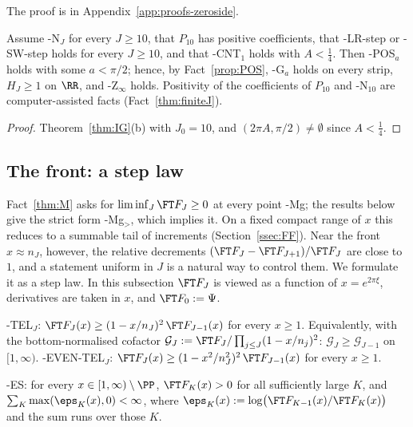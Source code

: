 The proof is in Appendix~\ref{app:proofs-zeroside}.

\begin{corollary}\label{cor:POSroute}
Assume \hyp{N}$_J$ for every $J\ge10$, that $P_{10}$ has positive coefficients, that \hyp{LR-step} or
\hyp{SW-step} holds for every $J\ge10$, and that \hyp{CNT$_1$} holds with $A<\frac14$. Then \hyp{POS$_a$} holds with some
$a<\pi/2$; hence, by Fact~\ref{prop:POS}, \hyp{G$_a$} holds on every strip, $H_J\ge1$ on $\RR$, and
\hyp{Z$_\infty$} holds. Positivity of the coefficients of $P_{10}$ and \hyp{N}$_{10}$ are computer-assisted facts
(Fact~\ref{thm:finiteJ}).
\end{corollary}

\begin{proof}
Theorem~\ref{thm:IG}(b) with $J_0=10$, and $(2\pi A,\pi/2)\ne\emptyset$ since $A<\frac14$.
\end{proof}

\subsection{The front: a step law}\label{ssec:front}

Fact~\ref{thm:M} asks for $\liminf_J\FT F_J\ge0$ at every point \hyp{Mg}; the results below give the strict form \hyp{Mg$_>$},
which implies it. On a fixed compact range of $x$ this reduces to a summable tail of increments (Section~\ref{ssec:FF}). Near the
front $x\approx n_J$, however, the relative decrements $(\FT F_J-\FT F_{J+1})/\FT F_J$ are close to $1$, and a statement uniform in $J$
is a natural way to control them. We formulate it as a step law. In this subsection $\FT F_J$ is viewed as a function of $x=e^{2\pi\xi}$,
derivatives are taken in $x$, and $\FT F_0:=\Psi$.

\begin{hypothesis}\label{hyp:TEL}
\hyp{TEL$_J$}: $\FT F_J(x)\ge(1-x/n_J)^2\,\FT F_{J-1}(x)$ for every $x\ge1$. Equivalently, with the bottom-normalised
cofactor $\mathcal G_J:=\FT F_J/\prod_{j\le J}(1-x/n_j)^2$: $\mathcal G_J\ge\mathcal G_{J-1}$ on $[1,\infty)$.
\hyp{EVEN-TEL$_J$}: $\FT F_J(x)\ge(1-x^2/n_J^2)^2\,\FT F_{J-1}(x)$ for every $x\ge1$.
\end{hypothesis}

\begin{hypothesis}\label{hyp:ES}
\hyp{ES}: for every $x\in[1,\infty)\setminus\PP$, $\FT F_K(x)>0$ for all sufficiently large $K$, and
$\sum_K\max(\eps_K(x),0)<\infty$, where $\eps_K(x):=\log\bigl(\FT F_{K-1}(x)/\FT F_K(x)\bigr)$ and the sum runs over
those $K$.
\end{hypothesis}

